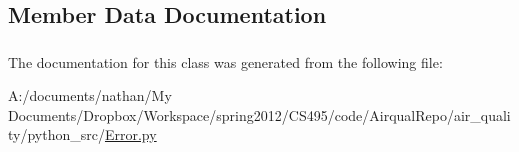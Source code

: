 \subsection{Member Data Documentation}
\hypertarget{class_error_1_1arduino_error_abd38cfdb82bda4f911c41d018130a3d0}{
\subsubsection[{expr}]{}}\label{class_error_1_1arduino_error_abd38cfdb82bda4f911c41d018130a3d0}
\hypertarget{class_error_1_1arduino_error_aa963133e309f1c2240e98e81d9c092e0}{
\subsubsection[{msg}]{}}\label{class_error_1_1arduino_error_aa963133e309f1c2240e98e81d9c092e0}


The documentation for this class was generated from the following file\-:\begin{DoxyCompactItemize}
\item 
A\-:/documents/nathan/\-My Documents/\-Dropbox/\-Workspace/spring2012/\-C\-S495/code/\-Airqual\-Repo/air\-\_\-quality/python\-\_\-src/\hyperlink{_error_8py}{Error.\-py}\end{DoxyCompactItemize}
